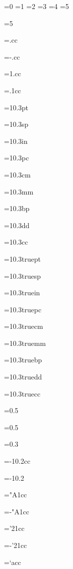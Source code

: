 =0
=1
=2
=3
=4
=5

=5
\showthe{}

=.cc
\showthe{}

=-.cc
\showthe{}

=1.cc
\showthe{}

=.1cc
\showthe{}

=10.3pt
\showthe{}

=10.3sp
\showthe{}

=10.3in
\showthe{}

=10.3pc
\showthe{}

=10.3cm
\showthe{}

=10.3mm
\showthe{}

=10.3bp
\showthe{}

=10.3dd
\showthe{}

=10.3cc
\showthe{}


=10.3truept
\showthe{}

=10.3truesp
\showthe{}

=10.3truein
\showthe{}

=10.3truepc
\showthe{}

=10.3truecm
\showthe{}

=10.3truemm
\showthe{}

=10.3truebp
\showthe{}

=10.3truedd
\showthe{}

=10.3truecc
\showthe{}

=0.5
\showthe{}

=0.5
\showthe{}

=0.3
\showthe{}

=-10.2cc
\showthe{}

=-10.2
\showthe{}

="A1cc
\showthe{}

=-"A1cc
\showthe{}

='21cc
\showthe{}

=-'21cc
\showthe{}

=`acc
\showthe{}

